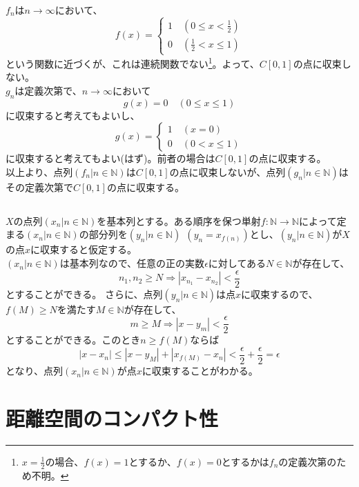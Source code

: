 \documentclass{jsarticle}
\begin{document}
\subsubsection{}
$f_n$は$n\to\infty$において、
\[f(x)=
\begin{cases}
1\quad(0\leq x<\frac{1}{2})\\
0\quad(\frac{1}{2}<x\leq 1)
\end{cases}
\]
という関数に近づくが、これは連続関数でない\footnote{$x=\frac{1}{2}$の場合、$f(x)=1$とするか、$f(x)=0$とするかは$f_n$の定義次第のため不明。}。よって、$C[0,1]$の点に収束しない。\\
$g_n$は定義次第で、$n\to\infty$において
\[g(x)=0 \quad(0\leq x\leq 1)\]
に収束すると考えてもよいし、
\[g(x)=
\begin{cases}
1\quad(x=0)\\
0\quad(0<x\leq 1)
\end{cases}
\]
に収束すると考えてもよい(はず)。前者の場合は$C[0,1]$の点に収束する。\\
以上より、点列$(f_n|n\in\mathbb{N})$は$C[0,1]$の点に収束しないが、点列$(g_n|n\in\mathbb{N})$はその定義次第で$C[0,1]$の点に収束する。


\subsection{}
$X$の点列$(x_n|n\in\mathbb{N})$を基本列とする。ある順序を保つ単射$f:\mathbb{N}\to\mathbb{N}$によって定まる$(x_n|n\in\mathbb{N})$の部分列を$(y_n|n\in\mathbb{N})\ \ (y_n=x_{f(n)})$とし、$(y_n|n\in\mathbb{N})$が$X$の点$x$に収束すると仮定する。\\
$(x_n|n\in\mathbb{N})$は基本列なので、任意の正の実数$\epsilon$に対してある$N\in\mathbb{N}$が存在して、
\[n_1,n_2\geq N\Longrightarrow|x_{n_1}-x_{n_2}|<\frac{\epsilon}{2}\]
とすることができる。
さらに、点列$(y_n|n\in\mathbb{N})$は点$x$に収束するので、$f(M)\geq N$を満たす$M\in\mathbb{N}$が存在して、
\[m\geq M\Longrightarrow |x-y_m|<\frac{\epsilon}{2}\]
とすることができる。このとき$n\geq f(M)$ならば
\[|x-x_n|\leq |x-y_M|+|x_{f(M)}-x_n|<\frac{\epsilon}{2}+\frac{\epsilon}{2}=\epsilon\]
となり、点列$(x_n|n\in\mathbb{N})$が点$x$に収束することがわかる。








\section{距離空間のコンパクト性}
\end{document}
